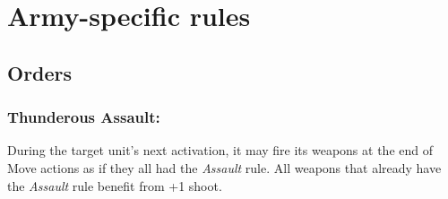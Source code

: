 \newcommand{\Autocannon}[1][3+]{\textbf{Autocannon}: R30 {#1} D4 [Deadly 2, Heavy, Rapid 2, Slow]}
\newcommand{\FragLauncher}[1][4+]{\textbf{Frag Launcher}: R20 {#1} D1 [Area Effect 6, Heavy, Slow]}
\newcommand{\GatlingGun}[1][3+]{\textbf{Gatling Gun}: R20 {#1} D4 [Heavy, Rapid 3, Suppressive 2]}
\newcommand{\HeavyBattleRifle}[1][3+]{\textbf{Heavy Battle Rifle}: R30 {#1} D3 [Heavy, Rapid 2, Suppressive 1]}
\newcommand{\LaserCannon}[1][3+]{\textbf{Laser Cannon}: R40 {#1} D8 [Critical 9+, Deadly D10, Heavy, Slow]}
\newcommand{\MagmaCannon}[1][4+]{\textbf{Magma Cannon}: R16 {#1} D8 [Critical 8+, Deadly 2D5, Slow]}
\newcommand{\MissileLauncher}[1][3+]{\textbf{Missile Launcher}: R40 {#1} D6 [Deadly D10, Slow] or R40 {#1} D1 [Area Effect 4, Heavy, Slow]}
\newcommand{\PlasmaCannon}[1][3+]{\textbf{Plasma Cannon}: R30 {#1} D6, [Area Effect 3, Deadly 2, Heavy, Unstable 1]}
\newcommand{\RocketArtillery}[1][4+]{\textbf{Rocket Artillery}: R10-40 {#1} D2 [Area Effect 3, Heavy, Indirect Fire, Slow, Suppressive 1]}
\newcommand{\SiegeCannon}[1][3+]{\textbf{Siege Cannon} R4-20 {#1} D8 [Area Effect 8, Deadly D5+3, Heavy, Slow, Terrifying 1]}
\newcommand{\TwinAutocannon}[1][3+]{\textbf{Twin Autocannon}: R30 {#1} D4 [Deadly 2, Heavy, Rapid 4, Slow]}
\newcommand{\TwinGatlingGun}[1][3+]{\textbf{Twin Gatling Gun}: R20 {#1} D3 [Heavy, Rapid 6, Suppressive 2]}
\newcommand{\TwinHeavyBattleRifle}[1][3+]{\textbf{Twin Heavy Battle Rifle}: R30 {#1} D3 [Heavy, Rapid 4, Suppressive 1]}
\newcommand{\TwinHeavyFlamethrower}{\textbf{Twin Heavy Flamethrower}: R8 Autohit D2 [Assault, Slow, Spray 10, Terrifying 2]}
\newcommand{\TwinLaserCannon}[1][3+]{\textbf{Twin Laser Cannon}: R40 {#1} D8 [Critical 9+, Deadly D10, Heavy, Rapid 2, Slow]}





\section*{Army-specific rules}



\subsection*{Orders}

\subsubsection*{Thunderous Assault:} During the target unit's next activation, it may fire its weapons at the end of Move actions as if they all had the \textit{Assault} rule. All weapons that already have the \textit{Assault} rule benefit from +1 shoot.



